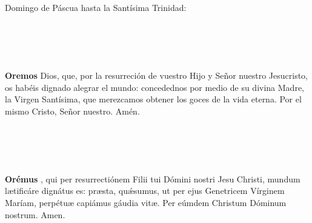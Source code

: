 \documentclass[10pt,a4paper,oneside]{book}
\begin{document}
\noindent\small{Domingo de Páscua hasta la Santísima Trinidad:}\\
\begin{minipage}[t]{0.475\textwidth}
    \\
    \\ 
    \\\\
    \textbf{Oremos}
     Dios, que, por la resurreción de vuestro Hijo y Señor nuestro Jesucristo,
    os habéis dignado alegrar el mundo: concedednos por medio de su divina Madre, la Virgen Santísima,
    que merezcamos obtener los goces de la vida eterna. Por el mismo Cristo, Señor nuestro. Amén. 
\end{minipage}
\begin{minipage}[t]{0.475\textwidth}
    \\
    \\ 
    \\\\
    \textbf{Orémus}
    , qui per resurrectiónem Filii tui Dómini nostri Jesu Christi,
    mundum l{\ae}tificáre dignátus es: pr{\ae}sta, qu{\'\ae}sumus, ut per ejus Genetricem Vírginem Maríam,
    perpétu{\ae} capiámus gáudia vit{\ae}. Per eúmdem Christum Dóminum nostrum. Amen.
\end{minipage}

\bigskip
\end{document}

